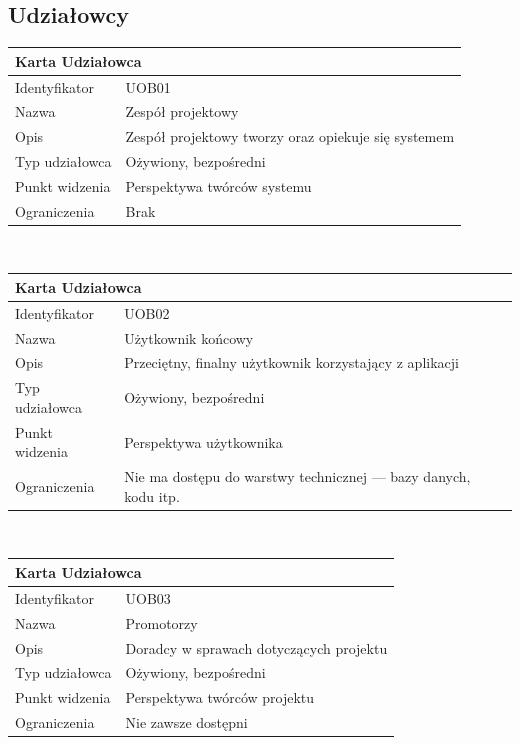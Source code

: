 \documentclass[a4paper,11pt]{report}
\begin{document}
\subsection {Udziałowcy}
\begin{tabular}{|p{3cm}|p{11cm}|}
	\hline
	\multicolumn{2}{|l|}{\textbf{Karta Udziałowca}}\\
	\hline
	Identyfikator&UOB01\\
	\hline
	Nazwa&Zespół projektowy\\
	\hline
	Opis&Zespół projektowy tworzy oraz opiekuje się systemem\\
	\hline
	Typ udziałowca&Ożywiony, bezpośredni\\
	\hline
	Punkt widzenia&Perspektywa twórców systemu\\
	\hline
	Ograniczenia&Brak\\
	\hline
	\end{tabular}\\
	\newline
	\vspace{0.2cm}
	\newline
	\begin{tabular}{|p{3cm}|p{11cm}|}
	\hline
	\multicolumn{2}{|l|}{\textbf{Karta Udziałowca}}\\
	\hline
	Identyfikator&UOB02\\
	\hline
	Nazwa&Użytkownik końcowy\\
	\hline
	Opis&Przeciętny, finalny użytkownik korzystający z aplikacji\\
	\hline
	Typ udziałowca&Ożywiony, bezpośredni\\
	\hline
	Punkt widzenia&Perspektywa użytkownika\\
	\hline
	Ograniczenia&Nie ma dostępu do warstwy technicznej — bazy danych, kodu itp.\\
	\hline
	\end{tabular}\\
	\newline
	\vspace{0.2cm}
	\newline
	\begin{tabular}{|p{3cm}|p{11cm}|}
	\hline
	\multicolumn{2}{|l|}{\textbf{Karta Udziałowca}}\\
	\hline
	Identyfikator&UOB03\\
	\hline
	Nazwa&Promotorzy\\
	\hline
	Opis&Doradcy w sprawach dotyczących projektu\\
	\hline
	Typ udziałowca&Ożywiony, bezpośredni\\
	\hline
	Punkt widzenia&Perspektywa twórców projektu\\
	\hline
	Ograniczenia&Nie zawsze dostępni\\
	\hline
	\end{tabular}\\
\end{document}
